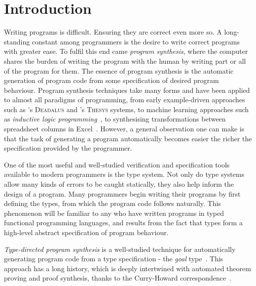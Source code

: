 \chapter{Introduction}
\label{chapter:intro}
Writing programs is difficult. Ensuring they are correct even more so. A
long-standing constant among programmers is the desire to write correct programs
with greater ease. To fulfil this end came \emph{program synthesis}, where the
computer shares the burden of writing the program with the human by writing part
or all of the program for them. The essence of program synthesis is the
automatic generation of program code from some specification of desired program
behaviour. Program synthesis techniques take many forms and have been applied to
almost all paradigms of programming, from early example-driven approaches such
as \citet{deadalus}'s \textsc{Deadalus} and \citet{10.1145/321992.322002}'s \textsc{Thesys} systems, to
machine learning approaches such as \textit{inductive logic
programming}~\citep{MUGGLETON1994629}, to synthesising transformations between
spreadsheet columns in Excel~\citep{flashfill}. However, a general observation
one can make is that the task of generating a program automatically becomes
easier the richer the specification provided by the programmer. 

One of the most useful and well-studied verification and specification tools
available to modern programmers is the type system. Not only do type systems
allow many kinds of errors to be caught statically, they also help inform the
design of a program. Many programmers begin writing their programs by first
defining the types, from which the program code follows naturally. This
phenomenon will be familiar to any who have written programs in typed functional
programming languages, and results from the fact that types form a high-level
abstract specification of program behaviour. 

\emph{Type-directed program synthesis} is a well-studied technique for
automatically generating program code from a type specification - the
\textit{goal} type~\citep{oseraMYTH1,10.1145/1809028.1806632, synthesis2,
DBLP:conf/cav/AlbarghouthiGK13, 10.1145/2737924.2737977,
osera2019constraintbased}. This approach has a long history, which is deeply
intertwined with automated theorem proving and proof synthesis, thanks to the
Curry-Howard correspondence~\citep{manna1980deductive,10.5555/1624562.1624585}. 

